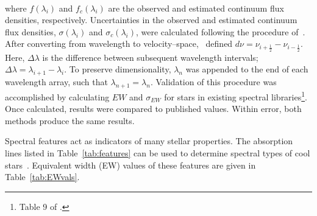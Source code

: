 \vfill\eject
{}\\
\noindent where $f(\lambda_{i})$ and $f_{c}(\lambda_{i})$ are the observed 
and estimated continuum flux densities, respectively.  Uncertainties in the 
observed and estimated continuum flux densities, $\sigma(\lambda_{i})$ and 
$\sigma_{c}(\lambda_{i})$, were calculated following the procedure 
of~\cite{Sembach_1992}.  After converting from wavelength to 
velocity--space,~\cite{Sembach_1992} defined 
$d\nu = \nu_{i+\frac{1}{2}} - \nu_{i-\frac{1}{2}}$.  
Here, $\Delta\lambda$ is the difference between subsequent 
wavelength intervals; $\Delta\lambda = \lambda_{i+1} - \lambda_{i}$.
To preserve dimensionality, $\lambda_{n}$ was appended to the end of each 
wavelength array, such that $\lambda_{n+1} = \lambda_{n}$. Validation of this 
procedure was accomplished by calculating $EW$ and $\sigma_{EW}$ for stars in 
existing spectral libraries\footnote{Table 9 of \cite{Rayner_2009}.}.  Once calculated, 
results were compared to published values.  Within error, both methods produce the same results.

\noindent {\bf $----------$}


\iffalse
	\indent {\bf I)} Spectral features act as indicators of many stellar properties.  \\
	\indent {\bf II)} Stellar properties can be determined through analysis of spectral features.  \\
	\indent {\bf III)} Stellar properties, including spectral type, can be determined by analyzing spectral features. Absorption lines listed in Table~\ref{tab:features} can be used to determine spectral types of cool stars~\cite{Rayner_2009}. \\
	\indent {\bf IV)} Spectral type is one of the many stellar properties revealed through spectral feature analysis.  The spectral features listed in Table~\ref{tab:features} can be used to determine spectral types of cool stars~\cite{Rayner_2009}. \\
\fi


\indent Spectral features act as indicators of many stellar properties.    
The absorption lines listed in Table~\ref{tab:features} can be used to determine spectral types of cool stars~\cite{Rayner_2009}.  
Equivalent width (EW) 
values of these features are given in Table~\ref{tab:EWvals}.  


